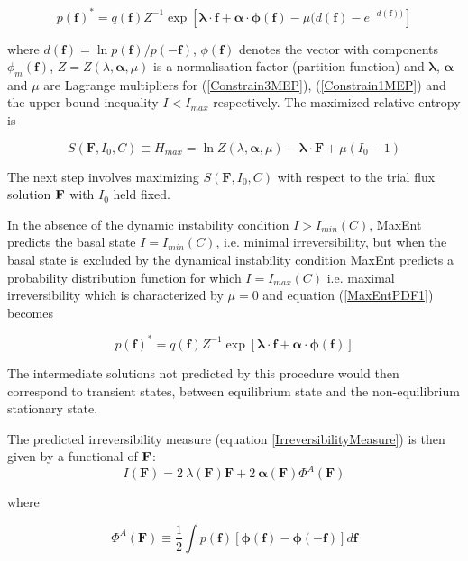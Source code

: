 \documentclass[a4paper,12pt]{article}
\begin{document}
\begin{equation}
\label{MaxEntPDF1}
  p(\bm{f})^* = q( \bm{f} ) Z^{-1} \exp[\bm{\lambda} \cdot \bm{f}+ \bm{\alpha} \cdot \bm{\phi} (\bm{f}) - \mu ( d(\bm{f}) - e^{-d(\bm{f}))}]
\end{equation}

where $d(\bm{f})= \ln{p(\bm{f})/p(-\bm{f})}$, $\phi(\bm{f})$ denotes the vector with components $\phi_m(\bm{f})$, $Z = Z(\lambda, \bm{\alpha},\mu)$ is a normalisation factor (partition function) and $\bm{\lambda}$, $\bm{\alpha}$ and $\mu$ are Lagrange multipliers for (\ref{Constrain3MEP}), (\ref{Constrain1MEP}) and the upper-bound inequality $I<I_{max}$ respectively. The maximized relative entropy is

\begin{equation}
  S(\bm{F}, I_0, C) \equiv H_{max} = \ln Z(\lambda, \bm{\alpha}, \mu) - \bm{\lambda} \cdot \bm{F} + \mu(I_0 -1)
\end{equation}

The next step involves maximizing $S(\bm{F}, I_0, C)$ with respect to the trial flux solution $\bf{F}$ with $I_0$ held fixed.

In the absence of the dynamic instability condition $I>I_{min}(C)$, MaxEnt predicts the basal state $I=I_{min}(C)$, i.e. minimal irreversibility, but when the basal state is excluded by the dynamical instability condition MaxEnt predicts a probability distribution function for which $I=I_{max}(C)$ i.e. maximal irreversibility which is characterized by $\mu =0$ and equation (\ref{MaxEntPDF1}) becomes

\begin{equation}
\label{MaxEntPDF2}
  p(\bm{f})^* = q( \bm{f} ) Z^{-1} \exp[\bm{\lambda} \cdot \bm{f}+ \bm{\alpha} \cdot \bm{\phi} (\bm{f})]
\end{equation}

The intermediate solutions not predicted by this procedure would then correspond to transient states, between equilibrium state and the non-equilibrium stationary state.

The predicted irreversibility measure (equation \ref{IrreversibilityMeasure}) is then given by a functional of $\bf{F}$:
\begin{equation}
  I(\bm{F}) =2\ \lambda(\bm{F}) \bm{F} + 2\ \bm{\alpha(\bm{F})} \Phi^A(\bm{F})
\end{equation}

where 

\begin{equation}
  \Phi^A(\bm{F}) \equiv \frac{1}{2} \int p(\bm{f})[\bm{\phi}(\bm{f})-\bm{\phi}(\bm{-f})]d\bm{f}
\end{equation}
\end{document}
